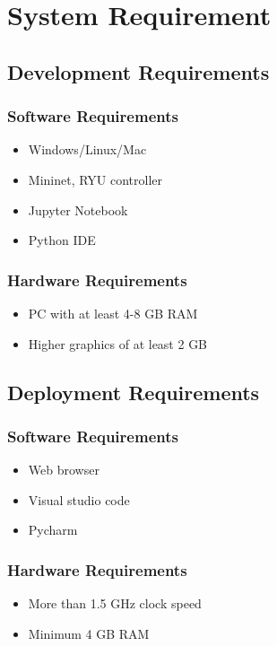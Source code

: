 \section{System Requirement}
\vspace{-18pt}
\subsection{Development Requirements}
\vspace{-18pt}
\subsubsection{Software Requirements}
\vspace{-10pt}
\begin{itemize}
\item Windows/Linux/Mac
\item Mininet, RYU controller
\item Jupyter Notebook
\item Python IDE
\end{itemize}
\subsubsection{Hardware Requirements}
\vspace{-10pt}
\begin{itemize}
\item PC with at least 4-8 GB RAM
\item  Higher graphics of at least 2 GB
\end{itemize}
\subsection{Deployment Requirements}
\vspace{-18pt}
\subsubsection{Software Requirements}
\vspace{-10pt}
\begin{itemize}
\item Web browser
\item Visual studio code
\item Pycharm
\end{itemize}
\vspace{-10pt}
\subsubsection{Hardware Requirements}
\vspace{-10pt}
\begin{itemize}
\item More than 1.5 GHz clock speed
\item Minimum 4 GB RAM
\end{itemize}
\label{tblSampleTable}
